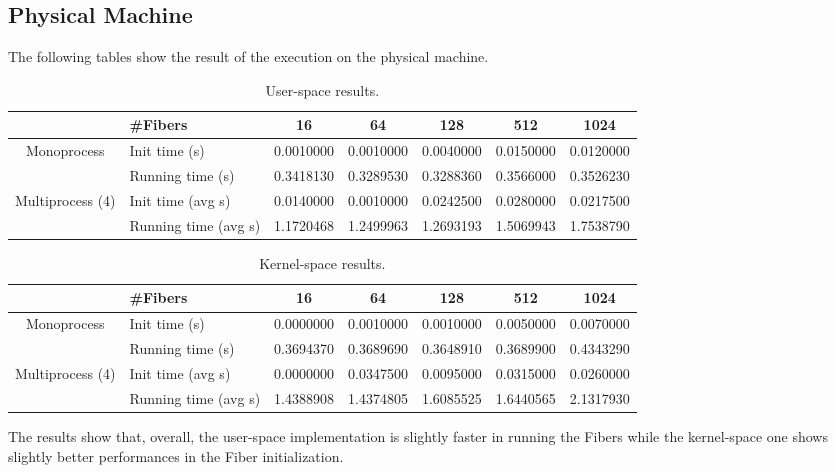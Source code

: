 \documentclass[11pt]{article}
\begin{document}
\subsection{Physical Machine}
The following tables show the result of the execution on the physical machine.

\begin{center}
\begin{table}[H]
\begin{tabular}{|c|l|c|c|c|c|c|}
\hline
\multicolumn{1}{|l|}{}            & \#Fibers             & 16        & 64        & 128       & 512       & 1024      \\ \hline
\multirow{2}{*}{Monoprocess}      & Init time (s)        & 0.0010000 & 0.0010000 & 0.0040000 & 0.0150000 & 0.0120000 \\ \cline{2-7} 
                                  & Running time (s)     & 0.3418130 & 0.3289530 & 0.3288360 & 0.3566000 & 0.3526230 \\ \hline
\multirow{2}{*}{Multiprocess (4)} & Init time (avg s)    & 0.0140000 & 0.0010000 & 0.0242500 & 0.0280000 & 0.0217500 \\ \cline{2-7} 
                                  & Running time (avg s) & 1.1720468 & 1.2499963 & 1.2693193 & 1.5069943 & 1.7538790 \\ \hline
\end{tabular}
\caption{User-space results.}
\label{table:t3}
\end{table}
\end{center}



\begin{center}
\begin{table}[H]
\begin{tabular}{|c|l|c|c|c|c|c|}
\hline
\multicolumn{1}{|l|}{}            & \#Fibers             & 16        & 64        & 128       & 512       & 1024      \\ \hline
\multirow{2}{*}{Monoprocess}      & Init time (s)        & 0.0000000 & 0.0010000 & 0.0010000 & 0.0050000 & 0.0070000 \\ \cline{2-7} 
                                  & Running time (s)     & 0.3694370 & 0.3689690 & 0.3648910 & 0.3689900 & 0.4343290 \\ \hline
\multirow{2}{*}{Multiprocess (4)} & Init time (avg s)    & 0.0000000 & 0.0347500 & 0.0095000 & 0.0315000 & 0.0260000 \\ \cline{2-7} 
                                  & Running time (avg s) & 1.4388908 & 1.4374805 & 1.6085525 & 1.6440565 & 2.1317930 \\ \hline
\end{tabular}
\caption{Kernel-space results.}
\label{table:t4}
\end{table}
\end{center}

The results show that, overall, the user-space implementation is slightly faster in running the Fibers while the kernel-space one shows slightly better performances in the Fiber initialization.
\end{document}
